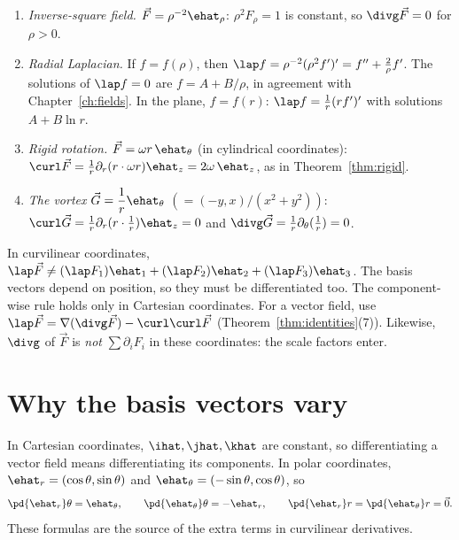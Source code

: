 \begin{example}
\begin{enumerate}[label=(\alph*)]
  \item \emph{Inverse-square field.} $\vec F=\rho^{-2}\ehat_\rho$: $\rho^2F_\rho=1$ is constant, so $\divg\vec F=0$ for $\rho>0$.
  \item \emph{Radial Laplacian.} If $f=f(\rho)$, then $\lap f=\rho^{-2}(\rho^2f')'=f''+\tfrac2\rho f'$. The solutions of $\lap f=0$ are $f=A+B/\rho$, in agreement with Chapter~\ref{ch:fields}. In the plane, $f=f(r)$: $\lap f=\frac1r(rf')'$ with solutions $A+B\ln r$.
  \item \emph{Rigid rotation.} $\vec F=\omega r\,\ehat_\theta$ (in cylindrical coordinates): $\curl\vec F=\frac1r\partial_r(r\cdot\omega r)\ehat_z=2\omega\,\ehat_z$, as in Theorem~\ref{thm:rigid}.
  \item \emph{The vortex} $\vec G=\dfrac1r\ehat_\theta$ $(=(-y,x)/(x^2+y^2))$: $\curl\vec G=\frac1r\partial_r(r\cdot\frac1r)\ehat_z=0$ and $\divg\vec G=\frac1r\partial_\theta(\frac1r)=0$.
\end{enumerate}
\end{example}

\begin{pitfall}
In curvilinear coordinates, $\lap\vec F\ne(\lap F_1)\ehat_1+(\lap F_2)\ehat_2+(\lap F_3)\ehat_3$. The basis vectors depend on position, so they must be differentiated too. The component-wise rule holds only in Cartesian coordinates. For a vector field, use $\lap\vec F=\nabla(\divg\vec F)-\curl\curl\vec F$ (Theorem~\ref{thm:identities}(7)). Likewise, $\divg$ of $\vec F$ is \emph{not} $\sum\partial_iF_i$ in these coordinates: the scale factors enter.
\end{pitfall}

\section{Why the basis vectors vary}

In Cartesian coordinates, $\ihat,\jhat,\khat$ are constant, so differentiating a vector field means differentiating its components. In polar coordinates, $\ehat_r=(\cos\theta,\sin\theta)$ and $\ehat_\theta=(-\sin\theta,\cos\theta)$, so
\[
\pd{\ehat_r}\theta=\ehat_\theta,\qquad\pd{\ehat_\theta}\theta=-\ehat_r,\qquad\pd{\ehat_r}r=\pd{\ehat_\theta}r=\vec 0 .
\]
These formulas are the source of the extra terms in curvilinear derivatives.

